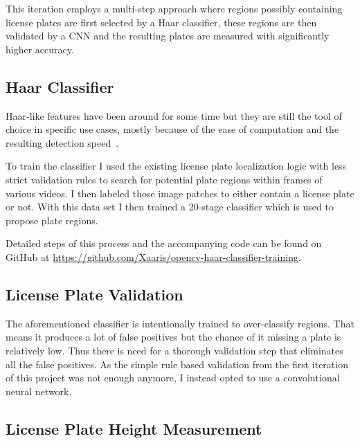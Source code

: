 This iteration employs a multi-step approach where regions possibly containing license plates are first selected by a Haar classifier, these regions are then validated by a CNN and the resulting plates are measured with significantly higher accuracy.

\subsection{Haar Classifier}

Haar-like features have been around for some time but they are still the tool of choice in specific use cases, mostly because of the ease of computation and the resulting detection speed~\cite{Viola2001}.

To train the classifier I used the existing license plate localization logic with less strict validation rules to search for potential plate regions within frames of various videos.
I then labeled those image patches to either contain a license plate or not.
With this data set I then trained a 20-stage classifier which is used to propose plate regions.

Detailed steps of this process and the accompanying code can be found on GitHub at \href{https://github.com/Xaaris/opencv-haar-classifier-training}{https://github.com/Xaaris/opencv-haar-classifier-training}.


\subsection{License Plate Validation}
The aforementioned classifier is intentionally trained to over-classify regions.
That means it produces a lot of false positives but the chance of it missing a plate is relatively low.
Thus there is need for a thorough validation step that eliminates all the false positives.
As the simple rule based validation from the first iteration of this project was not enough anymore, I instead opted to use a convolutional neural network.

\subsection{License Plate Height Measurement}

